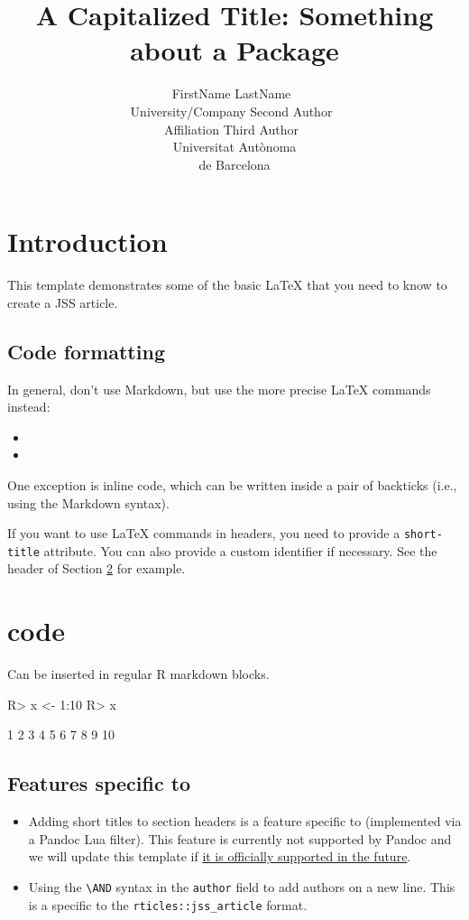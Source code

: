 \documentclass[
]{jss}
\author{
FirstName LastName~\orcidlink{0000-0000-0000-0000}\\University/Company \And Second Author~\orcidlink{0000-0000-0000-0000}\\Affiliation \AND Third Author~\orcidlink{0000-0000-0000-0000}\\Universitat Autònoma\\
de Barcelona
}
\title{A Capitalized Title: Something about a Package \pkg{foo}}
\providecommand{\tightlist}{%
  \setlength{\itemsep}{0pt}\setlength{\parskip}{0pt}}
\begin{document}
\hypertarget{introduction}{%
\section{Introduction}\label{introduction}}

This template demonstrates some of the basic LaTeX that you need to know
to create a JSS article.

\hypertarget{code-formatting}{%
\subsection{Code formatting}\label{code-formatting}}

In general, don't use Markdown, but use the more precise LaTeX commands
instead:

\begin{itemize}
\item
\item
\end{itemize}

One exception is inline code, which can be written inside a pair of
backticks (i.e., using the Markdown syntax).

If you want to use LaTeX commands in headers, you need to provide a
\texttt{short-title} attribute. You can also provide a custom identifier
if necessary. See the header of Section \ref{r-code} for example.

\section[R code]{ code}\label{r-code}

Can be inserted in regular R markdown blocks.

\begin{CodeChunk}
\begin{CodeInput}
R> x <- 1:10
R> x
\end{CodeInput}
\begin{CodeOutput}
 [1]  1  2  3  4  5  6  7  8  9 10
\end{CodeOutput}
\end{CodeChunk}

\subsection[Features specific to rticles]{Features specific to
}\label{features-specific-to}

\begin{itemize}
\tightlist
\item
  Adding short titles to section headers is a feature specific to
   (implemented via a Pandoc Lua filter). This feature is
  currently not supported by Pandoc and we will update this template if
  \href{https://github.com/jgm/pandoc/issues/4409}{it is officially
  supported in the future}.
\item
  Using the \texttt{\textbackslash{}AND} syntax in the \texttt{author}
  field to add authors on a new line. This is a specific to the
  \texttt{rticles::jss\_article} format.
\end{itemize}
\end{document}

